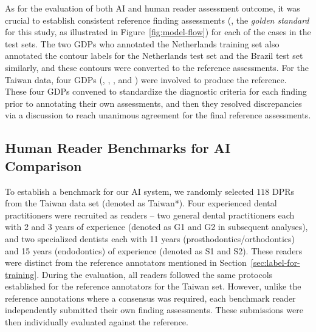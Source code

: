 As for the evaluation of both AI and human reader assessment outcome, it was crucial to establish consistent reference finding assessments (\ie, the \emph{golden standard} for this study, as illustrated in Figure~\ref{fig:model-flow}) for each of the cases in the test sets.
The two GDPs who annotated the Netherlands training set also annotated the contour labels for the Netherlands test set and the Brazil test set similarly, and these contours were converted to the reference assessments.
For the Taiwan data, four GDPs (\gdpYW, \gdpCC, \gdpHC, and \gdpHW) were involved to produce the reference.
These four GDPs convened to standardize the diagnostic criteria for each finding prior to annotating their own assessments, and then they resolved discrepancies via a discussion to reach unanimous agreement for the final reference assessments.


\subsection{Human Reader Benchmarks for AI Comparison}

To establish a benchmark for our AI system, we randomly selected $\num{118}$ DPRs from the Taiwan data set (denoted as Taiwan*).
Four experienced dental practitioners were recruited as readers -- two general dental practitioners each with 2 and 3 years of experience (denoted as G1 and G2 in subsequent analyses), and two specialized dentists each with 11 years (prosthodontics/orthodontics) and 15 years (endodontics) of experience (denoted as S1 and S2).
These readers were distinct from the reference annotators mentioned in Section~\ref{sec:label-for-training}.
During the evaluation, all readers followed the same protocols established for the reference annotators for the Taiwan set.
However, unlike the reference annotations where a consensus was required, each benchmark reader independently submitted their own finding assessments.
These submissions were then individually evaluated against the reference.

